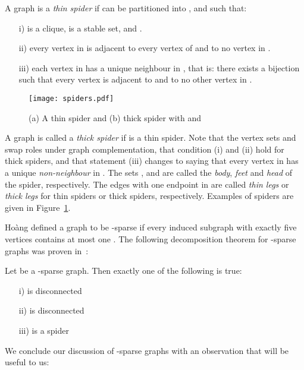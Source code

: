 \documentclass{llncs}
\begin{document}
\begin{definition}
A graph  is a \emph{thin spider} if  can be partitioned into ,  and  such that:
\begin{itemize}
\item[i)]  is a clique,  is a stable set, and .
\item[ii)] every vertex in  is adjacent to every vertex of  and to no vertex in .
\item[iii)] each vertex in  has a unique neighbour in , that is: there exists a bijection  such that every vertex  is adjacent to  and to no other vertex in .
\end{itemize}
\end{definition}

\begin{figure}
    \hspace{2.6cm}
  \texttt{[image: spiders.pdf]}\\
  \caption{(a) A thin spider and (b) thick spider with  and  }\label{spider}
\end{figure}

A graph  is called a \emph{thick spider} if  is a thin spider. Note that the vertex sets  and  swap roles under graph complementation, that condition (i) and (ii) hold for thick spiders, and that statement (iii) changes to saying that every vertex in  has a unique \emph{non-neighbour} in . The sets ,  and  are called the \emph{body}, \emph{feet} and \emph{head} of the spider, respectively. The edges with one endpoint in  are called \emph{thin legs} or \emph{thick legs} for thin spiders or thick spiders, respectively. Examples of spiders are given in Figure~\ref{spider}.

Ho\`ang \cite{Hoa} defined a graph  to be -sparse if every induced subgraph with exactly five vertices contains at most one . The following decomposition theorem for -sparse graphs was proven in~\cite{JaOl}:
\begin{lemma}\cite{JaOl}
Let  be a -sparse graph. Then exactly one of the following is true:
\begin{itemize}
\item[i)]  is disconnected
\item[ii)]  is disconnected
\item[iii)]  is a spider
\end{itemize}
\end{lemma}

We conclude our discussion of -sparse graphs with an observation that will be useful to us:
\end{document}
